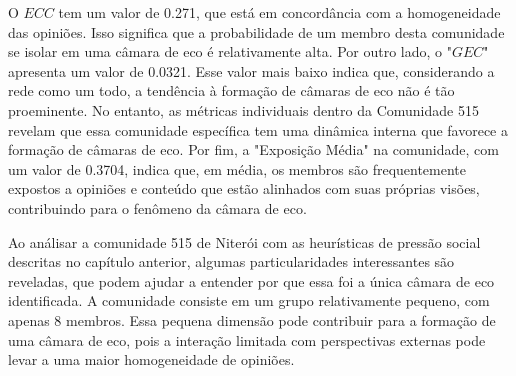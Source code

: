 O $ECC$ tem um valor de 0.271, que está em concordância com a homogeneidade das opiniões. Isso significa que a probabilidade de um membro desta comunidade se isolar em uma câmara de eco é relativamente alta. Por outro lado, o "$GEC$" apresenta um valor de 0.0321. Esse valor mais baixo indica que, considerando a rede como um todo, a tendência à formação de câmaras de eco não é tão proeminente. No entanto, as métricas individuais dentro da Comunidade 515 revelam que essa comunidade específica tem uma dinâmica interna que favorece a formação de câmaras de eco. Por fim, a "Exposição Média" na comunidade, com um valor de 0.3704, indica que, em média, os membros são frequentemente expostos a opiniões e conteúdo que estão alinhados com suas próprias visões, contribuindo para o fenômeno da câmara de eco.

\begin{table}[ht]
	\centering
	\caption{Resumo das Métricas Pressão Social das Comunidades Identificadas como Câmara de Eco em Niterói}
	\label{tab:community-metrics-niteroi}
\end{table}

Ao análisar a comunidade 515 de Niterói com as heurísticas de pressão social descritas no capítulo anterior, algumas particularidades interessantes são reveladas, que podem ajudar a entender por que essa foi a única câmara de eco identificada. A comunidade consiste em um grupo relativamente pequeno, com apenas 8 membros. Essa pequena dimensão pode contribuir para a formação de uma câmara de eco, pois a interação limitada com perspectivas externas pode levar a uma maior homogeneidade de opiniões.

